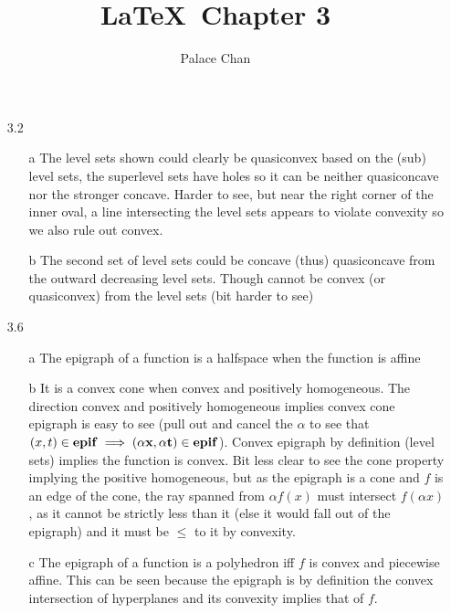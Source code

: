 \documentclass[12pt]{article}
\title{\LaTeX\ Chapter 3}
\author{Palace Chan}
\begin{document}
\maketitle
\newpage

\begin{itemize}

\item[3.2]
  \begin{itemize}
  \item[a] The level sets shown could clearly be quasiconvex based on the (sub) level sets, the superlevel sets have holes so it can be neither quasiconcave nor the stronger concave. Harder to see, but near the right corner of the inner oval, a line intersecting the level sets appears to violate convexity so we also rule out convex.
  \item[b] The second set of level sets could be concave (thus) quasiconcave from the outward decreasing level sets. Though cannot be convex (or quasiconvex) from the level sets (bit harder to see)
  \end{itemize}

\item[3.6]
  \begin{itemize}
  \item[a] The epigraph of a function is a halfspace when the function is affine
  \item[b] It is a convex cone when convex and positively homogeneous. The direction convex and positively homogeneous implies convex cone epigraph is easy to see (pull out and cancel the $\alpha$ to see that $(x,t) \in \bf{epi} f \implies (\alpha x, \alpha t) \in \bf{epi} f$). Convex epigraph by definition (level sets) implies the function is convex. Bit less clear to see the cone property implying the positive homogeneous, but as the epigraph is a cone and $f$ is an edge of the cone, the ray spanned from $\alpha f(x)$ must intersect $f(\alpha x)$, as it cannot be strictly less than it (else it would fall out of the epigraph) and it must be $\leq$ to it by convexity.
    
  \item[c] The epigraph of a function is a polyhedron iff $f$ is convex and piecewise affine. This can be seen because the epigraph is by definition the convex intersection of hyperplanes and its convexity implies that of $f$.
  \end{itemize}


\end{itemize}
\end{document}
